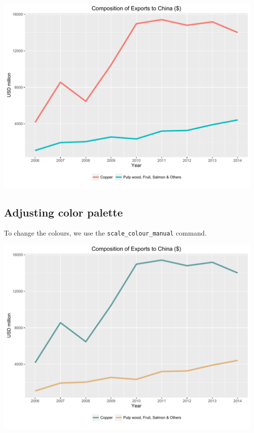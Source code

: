 \documentclass[]{article}
\newenvironment{Shaded}{\begin{snugshade}}{\end{snugshade}}
\newcommand{\KeywordTok}[1]{\textcolor[rgb]{0.13,0.29,0.53}{\textbf{{#1}}}}
\newcommand{\DataTypeTok}[1]{\textcolor[rgb]{0.13,0.29,0.53}{{#1}}}
\newcommand{\StringTok}[1]{\textcolor[rgb]{0.31,0.60,0.02}{{#1}}}
\newcommand{\NormalTok}[1]{{#1}}
\begin{document}
\begin{center}\includegraphics{0_all_posts_pdf/line_5-1} \end{center}

\subsection{Adjusting color palette}\label{adjusting-color-palette}

To change the colours, we use the \texttt{scale\_colour\_manual}
command.

\begin{Shaded}
\end{Shaded}

\begin{center}\includegraphics{0_all_posts_pdf/line_6-1} \end{center}
\end{document}

